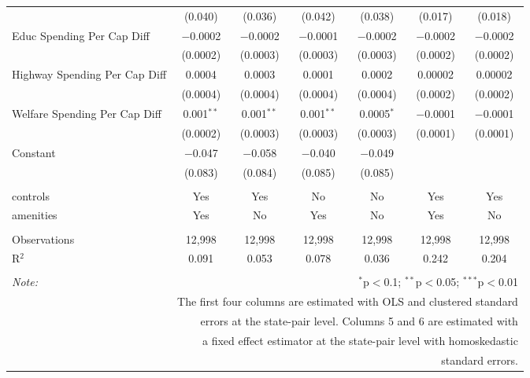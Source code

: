 \begin{table}[!htbp]
\begin{tabular}{@{\extracolsep{5pt}}lcccccc}
  & (0.040) & (0.036) & (0.042) & (0.038) & (0.017) & (0.018) \\ 
  Educ Spending Per Cap Diff & $-$0.0002 & $-$0.0002 & $-$0.0001 & $-$0.0002 & $-$0.0002 & $-$0.0002 \\ 
  & (0.0002) & (0.0003) & (0.0003) & (0.0003) & (0.0002) & (0.0002) \\ 
  Highway Spending Per Cap Diff & 0.0004 & 0.0003 & 0.0001 & 0.0002 & 0.00002 & 0.00002 \\ 
  & (0.0004) & (0.0004) & (0.0004) & (0.0004) & (0.0002) & (0.0002) \\ 
  Welfare Spending Per Cap Diff & 0.001$^{**}$ & 0.001$^{**}$ & 0.001$^{**}$ & 0.0005$^{*}$ & $-$0.0001 & $-$0.0001 \\ 
  & (0.0002) & (0.0003) & (0.0003) & (0.0003) & (0.0001) & (0.0001) \\ 
  Constant & $-$0.047 & $-$0.058 & $-$0.040 & $-$0.049 &  &  \\ 
  & (0.083) & (0.084) & (0.085) & (0.085) &  &  \\ 
 \hline \\[-1.8ex] 
controls & Yes & Yes & No & No & Yes & Yes \\ 
amenities & Yes & No & Yes & No & Yes & No \\ 
\hline \\[-1.8ex] 
Observations & 12,998 & 12,998 & 12,998 & 12,998 & 12,998 & 12,998 \\ 
R$^{2}$ & 0.091 & 0.053 & 0.078 & 0.036 & 0.242 & 0.204 \\ 
\hline 
\hline \\[-1.8ex] 
\textit{Note:}  & \multicolumn{6}{r}{$^{*}$p$<$0.1; $^{**}$p$<$0.05; $^{***}$p$<$0.01} \\ 
 & \multicolumn{6}{r}{The first four columns are estimated with OLS and clustered standard} \\ 
 & \multicolumn{6}{r}{ errors at the state-pair level. Columns 5 and 6 are estimated with} \\ 
 & \multicolumn{6}{r}{a fixed effect estimator at the state-pair level with homoskedastic} \\ 
 & \multicolumn{6}{r}{standard errors.} \\ 
\end{tabular} 
\end{table} 
